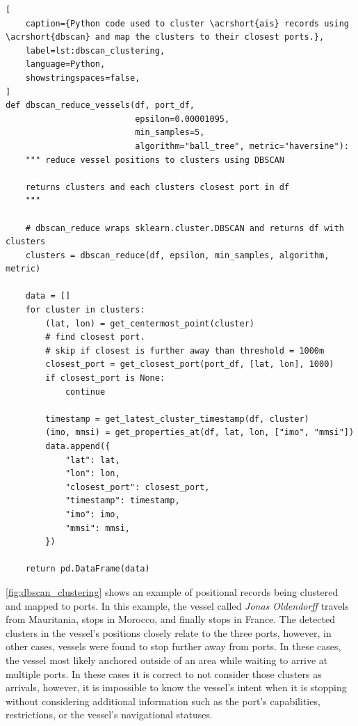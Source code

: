 \begin{lstlisting}[
    caption={Python code used to cluster \acrshort{ais} records using \acrshort{dbscan} and map the clusters to their closest ports.},
    label=lst:dbscan_clustering,
    language=Python,
    showstringspaces=false,
]
def dbscan_reduce_vessels(df, port_df,
                          epsilon=0.00001095,
                          min_samples=5,
                          algorithm="ball_tree", metric="haversine"):
    """ reduce vessel positions to clusters using DBSCAN

    returns clusters and each clusters closest port in df
    """

    # dbscan_reduce wraps sklearn.cluster.DBSCAN and returns df with clusters
    clusters = dbscan_reduce(df, epsilon, min_samples, algorithm, metric)

    data = []
    for cluster in clusters:
        (lat, lon) = get_centermost_point(cluster)
        # find closest port.
        # skip if closest is further away than threshold = 1000m
        closest_port = get_closest_port(port_df, [lat, lon], 1000)
        if closest_port is None:
            continue

        timestamp = get_latest_cluster_timestamp(df, cluster)
        (imo, mmsi) = get_properties_at(df, lat, lon, ["imo", "mmsi"])
        data.append({
            "lat": lat,
            "lon": lon,
            "closest_port": closest_port,
            "timestamp": timestamp,
            "imo": imo,
            "mmsi": mmsi,
        })

    return pd.DataFrame(data)
\end{lstlisting}

\cref{fig:dbscan_clustering} shows an example of positional records being clustered and mapped to ports. In this example, the vessel called \textit{Jonas Oldendorff} travels from Mauritania, stops in Morocco, and finally stops in France. The detected clusters in the vessel's positions closely relate to the three ports, however, in other cases, vessels were found to stop further away from ports. In these cases, the vessel most likely anchored outside of an area while waiting to arrive at multiple ports. In these cases it is correct to not consider those clusters as arrivals, however, it is impossible to know the vessel's intent when it is stopping without considering additional information such as the port's capabilities, restrictions, or the vessel's navigational statuses.

